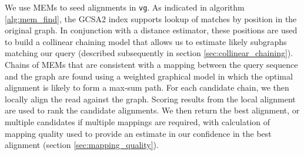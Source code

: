 
We use MEMs to seed alignments in {\tt vg}.
As indicated in algorithm \ref{alg:mem_find}, the GCSA2 index supports lookup of matches by position in the original graph.
In conjunction with a distance estimator, these positions are used to build a collinear chaining model that allows us to estimate likely subgraphs matching our query (described subsequently in section \ref{sec:collinear_chaining}).
Chains of MEMs that are consistent with a mapping between the query sequence and the graph are found using a weighted graphical model in which the optimal alignment is likely to form a max-sum path.
For each candidate chain, we then locally align the read against the graph. 
Scoring results from the local alignment are used to rank the candidate alignments.
We then return the best alignment, or multiple candidates if multiple mappings are required, with calculation of mapping quality used to provide an estimate in our confidence in the best alignment (section \ref{sec:mapping_quality}).

